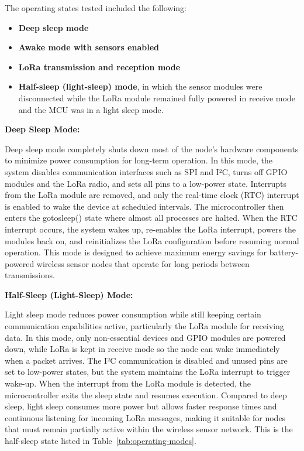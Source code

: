 The operating states tested included the following:

\begin{itemize}
\item
  \textbf{Deep sleep mode}
\item
  \textbf{Awake mode with sensors enabled}
\item
  \textbf{LoRa transmission and reception mode}
\item
  \textbf{Half-sleep (light-sleep) mode}, in which the sensor modules were
  disconnected while the LoRa module remained fully powered in receive
  mode and the MCU was in a light sleep mode.
\end{itemize}

\textbf{Deep Sleep Mode:}

Deep sleep mode completely shuts down most of the node's hardware
components to minimize power consumption for long-term operation. In
this mode, the system disables communication interfaces such as SPI and
I²C, turns off GPIO modules and the LoRa radio, and sets all pins to a
low-power state. Interrupts from the LoRa module are removed, and only
the real-time clock (RTC) interrupt is enabled to wake the device at
scheduled intervals. The microcontroller then enters the gotosleep()
state where almost all processes are halted. When the RTC interrupt
occurs, the system wakes up, re-enables the LoRa interrupt, powers the
modules back on, and reinitializes the LoRa configuration before
resuming normal operation. This mode is designed to achieve maximum
energy savings for battery-powered wireless sensor nodes that operate
for long periods between transmissions.

\textbf{Half-Sleep (Light-Sleep) Mode:}

Light sleep mode reduces power consumption while still keeping certain
communication capabilities active, particularly the LoRa module for
receiving data. In this mode, only non-essential devices and GPIO
modules are powered down, while LoRa is kept in receive mode so the node
can wake immediately when a packet arrives. The I²C communication is
disabled and unused pins are set to low-power states, but the system
maintains the LoRa interrupt to trigger wake-up. When the interrupt from
the LoRa module is detected, the microcontroller exits the sleep state
and resumes execution. Compared to deep sleep, light sleep consumes more
power but allows faster response times and continuous listening for
incoming LoRa messages, making it suitable for nodes that must remain
partially active within the wireless sensor network. This is the half-sleep state listed in Table~\ref{tab:operating-modes}.


